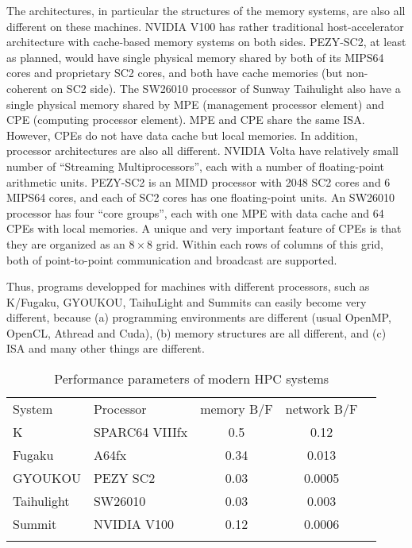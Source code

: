 
The architectures, in particular the structures of the memory systems,
are also all different on these machines. NVIDIA V100 has rather
traditional host-accelerator architecture with cache-based memory
systems on both sides. PEZY-SC2, at least as
planned, would have single physical memory shared by both of its
MIPS64 cores and proprietary SC2 cores, and both have cache memories
(but non-coherent on SC2 side). The SW26010 processor of Sunway
Taihulight also have a single physical memory shared by MPE
(management processor element) and CPE (computing processor element).
MPE and CPE share the same ISA. However, CPEs do not have data cache
but local memories. In addition, processor architectures are also all
different. NVIDIA Volta have relatively small number of ``Streaming
Multiprocessors'', each with a number of floating-point arithmetic
units.  PEZY-SC2 is an MIMD processor with 2048 SC2 cores and 6 MIPS64
cores, and each of SC2 cores has one floating-point units. An SW26010
processor has four ``core groups'', each with one MPE with data cache
and 64 CPEs with local memories. A unique and very important feature
of CPEs is that they are organized as an $8\times8$ grid.  Within each rows
of columns of this grid, both of point-to-point communication and
broadcast are supported. 

Thus, programs developped for machines with different processors, such
as K/Fugaku, GYOUKOU, TaihuLight and Summits can easily become very
different, because (a) programming environments are different (usual
OpenMP, OpenCL, Athread and Cuda), (b) memory structures are all
different, and (c) ISA and many other things are different.



\begin{table}
\centering  
\caption{Performance parameters of modern HPC systems}
\label{tab:hpcmachines}       %
\begin{tabular}{llccc}
\hline\noalign{\smallskip}
System  & Processor & memory B/F & network B/F   \\
\noalign{\smallskip}\hline\noalign{\smallskip}
K  & SPARC64 VIIIfx & 0.5 &    0.12 \\
Fugaku  &  A64fx& 0.34 &       0.013   \\
GYOUKOU  & PEZY SC2& 0.03 &    0.0005   \\
Taihulight  & SW26010 & 0.03 & 0.003 \\
Summit  & NVIDIA V100 & 0.12 & 0.0006 \\
\noalign{\smallskip}\hline
\end{tabular}
\end{table}

